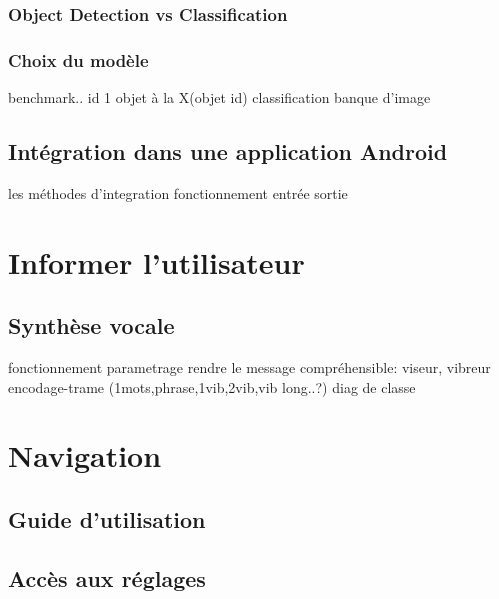 \documentclass[UTF8]{EPURapport}
\begin{document}
\subsubsection{Object Detection vs Classification}


\subsubsection{Choix du modèle}

benchmark..
id 1 objet à la X(objet id)
classification
banque d'image
\subsection{Intégration dans une application Android}
les méthodes d'integration
fonctionnement
entrée sortie

\section{Informer l'utilisateur}
\subsection{Synthèse vocale}
fonctionnement
parametrage
rendre le message compréhensible: viseur,
vibreur
encodage-trame (1mots,phrase,1vib,2vib,vib long..?)
diag de classe

\section{Navigation}
\subsection{Guide d'utilisation}
\subsection{Accès aux réglages}

\annexes
\end{document}
